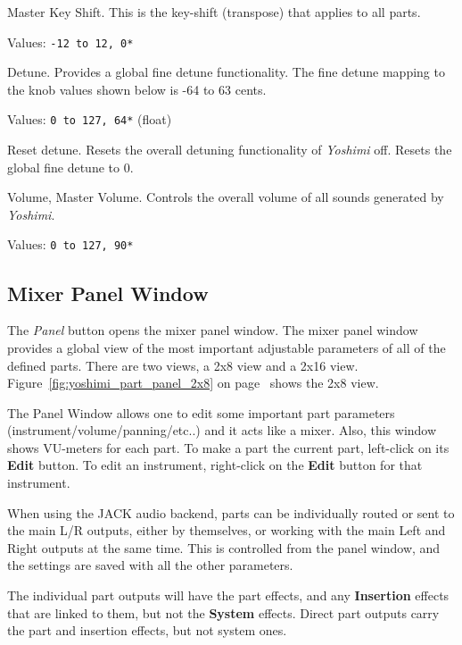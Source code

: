    Master Key Shift.
   This is the key-shift (transpose) that applies to all parts.

   Values: \texttt{-12 to 12, 0*}

   Detune.  Provides a global fine detune functionality.
   The fine detune mapping to the knob values shown below is
   -64 to 63 cents.

   Values: \texttt{0 to 127, 64*} (float)

   Reset detune.
   Resets the overall detuning functionality of 
   \textsl{Yoshimi} off.
   Resets the global fine detune to 0.

   Volume, Master Volume.
   Controls the overall volume of all sounds generated by
   \textsl{Yoshimi}.

   Values: \texttt{0 to 127, 90*}

\subsection{Mixer Panel Window}
\label{subsec:mixer_panel_window}

   The \textsl{Panel} button opens the mixer panel window.
   The mixer panel window provides a global view of the most important
   adjustable parameters of all of the defined parts.
   There are two views, a 2x8 view and a 2x16 view.
   Figure~\ref{fig:yoshimi_part_panel_2x8} on
   page~\pageref{fig:yoshimi_part_panel_2x8}
   shows the 2x8 view.

   The Panel Window allows one to edit some important part parameters
   (instrument/volume/panning/etc..) and it acts like a mixer. Also, this
   window shows VU-meters for each part.  To make a part the current part,
   left-click on its \textbf{Edit} button. To edit an instrument, right-click
   on the \textbf{Edit} button for that instrument.

   When using the JACK audio backend, parts can be individually routed or sent
   to the main L/R outputs, either by themselves, or working with the main Left
   and Right outputs at the same time.  This is controlled from the panel
   window, and the settings are saved with all the other parameters.

   The individual part outputs will have the part effects, and any
   \textbf{Insertion} effects that are linked to them, but not the
   \textbf{System} effects.
   Direct part outputs carry the part and insertion effects, but not system
   ones.

